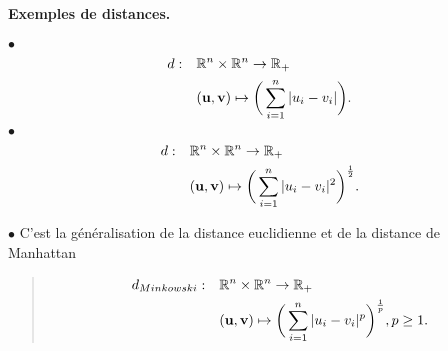 \documentclass[letterpaper,11pt,english]{sphinxmanual}
\begin{document}
\paragraph{Exemples de distances.}
\label{\detokenize{chapter2:exemples-de-distances}}
\sphinxAtStartPar
\(\bullet\)
\begin{equation}\label{equation:chapter2:chapter2:20}
\begin{split}\begin{aligned}
    d:\quad &\mathbb{R}^n\times \mathbb{R}^{n}\rightarrow{\mathbb{R}_+}\nonumber\\
    &(\mathbf{u}, \mathbf{v})\mapsto \bigg{(}\sum_{i=1}^{n}|u_i-v_i|\bigg{)}.
    \end{aligned}\end{split}
\end{equation}
\sphinxAtStartPar
\(\bullet\)
\begin{equation}\label{equation:chapter2:chapter2:21}
\begin{split}\begin{aligned}
    d:\quad &\mathbb{R}^n\times \mathbb{R}^n\rightarrow{\mathbb{R}_+}\nonumber \\
    &(\mathbf{u}, \mathbf{v})\mapsto \bigg{(}\sum_{i=1}^{n}|u_i-v_i|^2\bigg{)}^{\frac{1}{2}}.
    \end{aligned}\end{split}
\end{equation}
\begin{DUlineblock}{0em}
\item[] \(\bullet\) C’est la généralisation de la distance euclidienne et
de la distance de Manhattan
\end{DUlineblock}
\begin{quote}
\begin{equation}\label{equation:chapter2:chapter2:22}
\begin{split}\begin{aligned}
    d_{Minkowski}:\quad &\mathbb{R}^n\times \mathbb{R}^n\rightarrow{\mathbb{R}_+}\nonumber \\
    &(\mathbf{u}, \mathbf{v})\mapsto \bigg{(}\sum_{i=1}^{n}|u_i-v_i|^p\bigg{)}^{\frac{1}{p}}, p\ge 1. \end{aligned}\end{split}
\end{equation}
\sphinxAtStartPar
{}
\end{quote}
\end{document}

